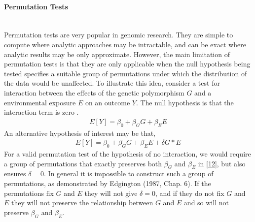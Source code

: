 \documentclass[11pt]{article}
\begin{document}
\paragraph{Permutation Tests}\mbox{}\\
Permutation tests are very popular in genomic research. They are simple to compute where analytic approaches may be intractable, and can be exact where analytic results may be only approximate. However, the main limitation of permutation tests is that they are only applicable when the null hypothesis being tested specifies a suitable group of permutations under which the distribution of the data would be unaffected. To illustrate this idea, consider a test for interaction between the effects of the genetic polymorphism $G$ and a environmental exposure $E$ on an outcome $Y$. The null hypothesis is that the interaction term is zero \citep{buzkova_permutation_2011}.
\begin{align}
E[Y]=\beta_0+\beta_GG+\beta_EE \label{12}
\end{align}
An alternative hypothesis of interest may be that,
\begin{align*}
E[Y]=\beta_0+\beta_GG+\beta_EE+\delta G*E
\end{align*}
For a valid permutation test of the hypothesis of no interaction, we would require a group of permutations that exactly preserves both $\beta_G$ and $\beta_E$ in \eqref{12}, but also ensures $\delta=0$. In general it is impossible to construct such a group of permutations, as demonstrated by Edgington (1987, Chap. 6). If the permutations fix $G$ and $E$ they will not give $\delta=0$, and if they do not fix $G$ and $E$ they will not preserve the relationship between $G$ and $E$ and so will not preserve $\beta_G$ and $\beta_E$.
\end{document}
